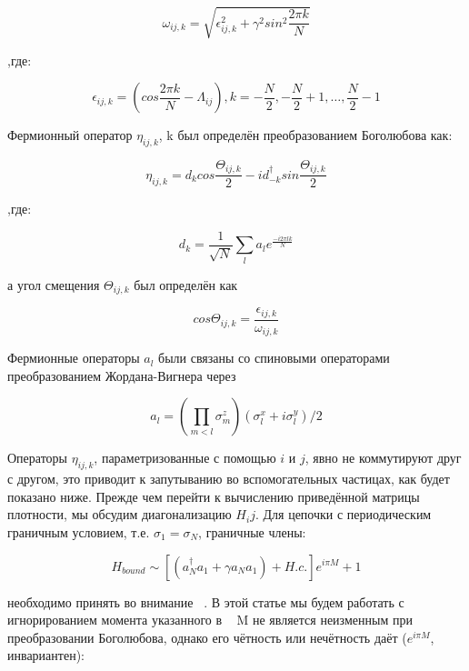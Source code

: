 \documentclass[11pt]{article}
\begin{document}
\begin{equation*}
\omega_{ij,k}=\sqrt{\epsilon_{ij,k}^2+\gamma^2sin^2\frac{2\pi k}{N}}
\end{equation*}

,где:
 
\begin{equation*}
\epsilon_{ij,k}=(cos\frac{2\pi k}{N}-\Lambda_{ij}), k=-\frac{N}{2},-\frac{N}{2}+1, \dots , \frac{N}{2}-1
\end{equation*}
 
Фермионный оператор $\eta_{ij,k}$, k был определён преобразованием Боголюбова как:

\begin{equation*}
\eta_{ij,k}=d_kcos\frac{\Theta_{ij,k}}{2}-id_{-k}^†sin\frac{\Theta_{ij,k}}{2}
\end{equation*}

,где:

\begin{equation*}
d_k=\frac{1}{\sqrt{N}} \sum\limits_l a_l e^{\frac{-i2\pi lk}{N}}
\end{equation*}

а угол смещения $\Theta_{ij,k}$ был определён как

\begin{equation*}
cos\Theta_{ij,k}=\frac{\epsilon_{ij,k}}{\omega_{ij,k}}
\end{equation*}

Фермионные операторы $a_l$ были связаны со спиновыми операторами преобразованием Жордана-Вигнера через

\begin{equation*}
a_l=(\prod_{m<l}\sigma_m^z)(\sigma_l^x+i\sigma_l^y)/2
\end{equation*}

Операторы $\eta_{ij,k}$, параметризованные с помощью $i$ и $j$, явно не коммутируют друг с другом, это приводит к запутыванию во вспомогательных частицах, как будет показано ниже. Прежде чем перейти к вычислению приведённой матрицы плотности, мы обсудим диагонализацию $H_ij$. Для цепочки с периодическим граничным условием, т.е. $\sigma_1 = \sigma_N$, граничные члены:

\begin{equation*}
H_{bound} \sim [(a_N^†a_1+\gamma a_N a_1)+H.c.]e^{i\pi M}+1
\end{equation*}

необходимо принять во внимание ~\cite{b21,b22}. В этой статье мы будем работать с игнорированием момента указанного в ~\cite{b21}
M не является неизменным при преобразовании Боголюбова, однако его чётность или нечётность даёт ($e^{i\pi M}$, инвариантен):  
\end{document}
